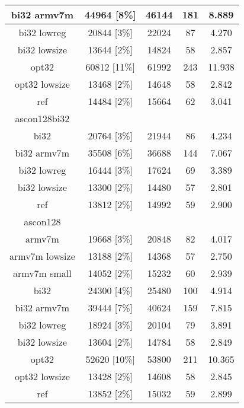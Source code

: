 \begin{table}[h]
\begin{tabular}{|c|c|c|c|c|}
        \hline
        bi32 armv7m & 44964 [8\%] & 46144 & 181 & 8.889 \\
        \hline
        bi32 lowreg & 20844 [3\%] & 22024 & 87 & 4.270 \\
        \hline
        bi32 lowsize & 13644 [2\%] & 14824 & 58 & 2.857 \\
        \hline
        opt32 & 60812 [11\%] & 61992 & 243 & 11.938 \\
        \hline
        opt32 lowsize & 13468 [2\%] & 14648 & 58 & 2.842 \\
        \hline
        ref & 14484 [2\%] & 15664 & 62 & 3.041 \\
        \hline
        ascon128bi32 & & & & \\
        \hline
        bi32 & 20764 [3\%] & 21944 & 86 & 4.234 \\
        \hline
        bi32 armv7m & 35508 [6\%] & 36688 & 144 & 7.067 \\
        \hline
        bi32 lowreg & 16444 [3\%] & 17624 & 69 & 3.389 \\
        \hline
        bi32 lowsize & 13300 [2\%] & 14480 & 57 & 2.801 \\
        \hline
        ref & 13812 [2\%] & 14992 & 59 & 2.900 \\
        \hline
        ascon128 & & & & \\
        \hline
        armv7m & 19668 [3\%] & 20848 & 82 & 4.017 \\
        \hline
        armv7m lowsize & 13188 [2\%] & 14368 & 57 & 2.750 \\
        \hline
        armv7m small & 14052 [2\%] & 15232 & 60 & 2.939 \\
        \hline
        bi32 & 24300 [4\%] & 25480 & 100 & 4.914 \\
        \hline
        bi32 armv7m & 39444 [7\%] & 40624 & 159 & 7.815 \\
        \hline
        bi32 lowreg & 18924 [3\%] & 20104 & 79 & 3.891 \\
        \hline
        bi32 lowsize & 13604 [2\%] & 14784 & 58 & 2.849 \\
        \hline
        opt32 & 52620 [10\%] & 53800 & 211 & 10.365 \\
        \hline
        opt32 lowsize & 13428 [2\%] & 14608 & 58 & 2.845 \\
        \hline
        ref & 13852 [2\%] & 15032 & 59 & 2.899 \\
        \hline
    \end{tabular}
\end{table}

